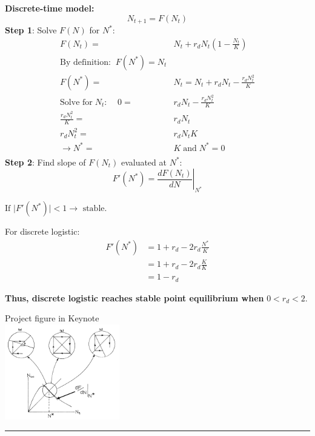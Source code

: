 \documentclass{article}
\newcommand{\note}[1]{\colorbox{gray!30}{#1}}
\begin{document}
\textbf{Discrete-time model:}
\begin{equation*}
	N_{t+1}= F(N_t)
\end{equation*}
\textbf{Step 1}:  Solve $F(N)$ for $N^*$:
\begin{align*}
	F(N_t)=& N_t+r_d N_t \left( 1-\frac{N_t}{K}\right)\\
	\text{By definition:}\; \; F(N^*)=N_t&\\
	F(N^*)=& N_t=N_t + r_d N_t - \frac{r_d N_t^2}{K}\\
	\text{Solve for} \; N_t: \;\;\;\;0=& r_d N_t-\frac{r_d N_t^2}{K}\\
	\frac{r_d N_t^2}{K}=& r_d N_t\\
	r_d N_t^2 =& r_d N_t K\\
	\to N^* =& K \; \text{and} \; N^*=0\\
\end{align*}
\textbf{Step 2}: Find slope of $F(N_t)$ evaluated at $N^*$:
\begin{equation*}
	F'(N^*)=\left.\frac{d F(N_t)}{dN}\right\vert_{N^*}
\end{equation*}
\begin{center}
$\boxed{\text{If }\vert F'(N^*)\vert <1 \to \text{ stable.}}$
\end{center}
For discrete logistic:
\begin{align*}
	F'(N^*)&=1+ r_d - 2 r_d \frac{N^*}{K}\\
	&= 1+r_d- 2 r_d \frac{K}{K}\\
	&= 1-r_d
\end{align*}
\begin{center}
\textbf{Thus, discrete logistic reaches stable point equilibrium when} $0 < r_d< 2$.
\end{center}

\begin{center}
	\note{Project figure in Keynote}\\
\includegraphics[width=5cm]{figs/RickerSlope.jpg}
\end{center}

\rule[0.5ex]{\linewidth}{1pt}
\end{document}
